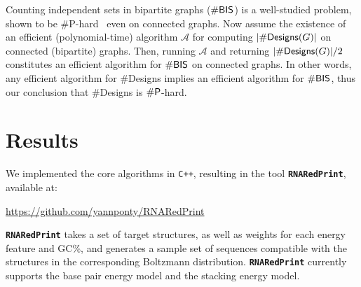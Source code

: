 \documentclass[]{bmcart}
\newenvironment{proof}[1][]{\noindent Proof\ifthenelse{\equal{#1}{}}{}{ (#1)}.~}{}
\newcommand{\Design}[1]{{\sf Designs}^{\star}(#1)}
\newcommand{\NumDesign}{\ensuremath{\#}{\sf Designs}\xspace}
\newcommand{\IS}[1]{{\sf IndSets}(#1)}
\newcommand{\Nuc}[1]{{\sf #1}}
\newcommand{\Cb}{\Nuc{C}}
\newcommand{\Gb}{\Nuc{G}}
\newcommand{\GCb}{\Gb\Cb}
\newcommand{\ourprog}{{\tt \bfseries{}\color{black!85}RNA\textcolor{red!70!black}{Red}Print}}
\newcommand{\citep}[1]{\cite{#1}}
\begin{document}
Counting independent sets in bipartite graphs ($\#{\sf BIS}$) is a well-studied problem, shown to be \#{\sf P}-hard~\citep{Ge2012} even on connected graphs. Now assume the existence of an efficient (polynomial-time) algorithm $\mathcal{A}$ for computing $|\NumDesign(G)|$ on connected (bipartite) graphs. Then, running $\mathcal{A}$ and returning $|\NumDesign(G)|/2$ constitutes an efficient algorithm for $\#{\sf BIS}$ on connected graphs.
In other words, any efficient algorithm for \NumDesign implies an efficient algorithm for $\#{\sf BIS}$, thus our conclusion that \NumDesign is $\#{\sf P}$-hard.






\section*{Results}\label{sec:results}

We implemented the core algorithms in \texttt{C++}, resulting in the tool
\ourprog{}, available at: 

{\centering \url{https://github.com/yannponty/RNARedPrint}\\[.3em]}%

\ourprog{}  takes a set of target structures, as well as
weights for each energy feature and \GCb\%, and generates a sample set of sequences compatible with the structures in the corresponding
Boltzmann distribution. \ourprog{} currently supports the base pair
energy model and the stacking energy model.
\end{document}
